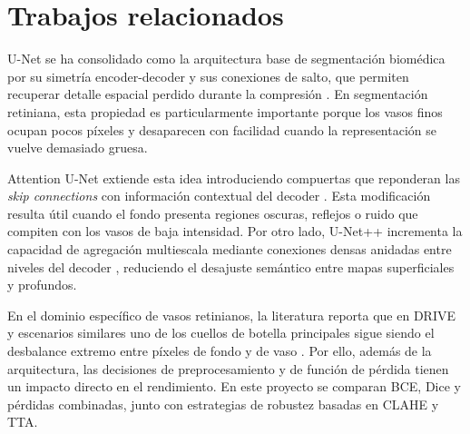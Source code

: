 \section{Trabajos relacionados}
U-Net se ha consolidado como la arquitectura base de segmentación biomédica por su simetría encoder-decoder y sus conexiones de salto, que permiten recuperar detalle espacial perdido durante la compresión \citep{ronneberger2015unet}. En segmentación retiniana, esta propiedad es particularmente importante porque los vasos finos ocupan pocos píxeles y desaparecen con facilidad cuando la representación se vuelve demasiado gruesa.

Attention U-Net extiende esta idea introduciendo compuertas que reponderan las \emph{skip connections} con información contextual del decoder \citep{oktay2018attention}. Esta modificación resulta útil cuando el fondo presenta regiones oscuras, reflejos o ruido que compiten con los vasos de baja intensidad. Por otro lado, U-Net++ incrementa la capacidad de agregación multiescala mediante conexiones densas anidadas entre niveles del decoder \citep{zhou2019unetpp}, reduciendo el desajuste semántico entre mapas superficiales y profundos.

En el dominio específico de vasos retinianos, la literatura reporta que en DRIVE y escenarios similares uno de los cuellos de botella principales sigue siendo el desbalance extremo entre píxeles de fondo y de vaso \citep{fraz2012review,staal2004drive}. Por ello, además de la arquitectura, las decisiones de preprocesamiento y de función de pérdida tienen un impacto directo en el rendimiento. En este proyecto se comparan BCE, Dice y pérdidas combinadas, junto con estrategias de robustez basadas en CLAHE \citep{pizer1987clahe} y TTA.
